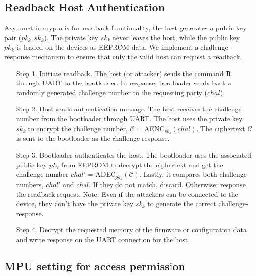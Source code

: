 \documentclass[11pt,oneside,onecolumn,letterpaper]{article}
\begin{document}
\subsection{Readback Host Authentication}
Asymmetric crypto is for readback functionality, the host generates a public key pair ($pk_k, sk_k$).
The private key $sk_k$ never leaves the host, while the public key $pk_k$ is loaded on the devices as EEPROM data.
We implement a challenge-response mechanism to ensure that only the valid host can request a readback.
\begin{itemize}
  \item[Step 1.] Initiate readback. 
  The host (or attacker) sends the command \textbf{R} through UART to the bootloader.
  In response, bootloader sends back a randomly generated challenge number to the requesting party ($chal$).  
  \item[Step 2.] Host sends authentication message.
  The host receives the challenge number from the bootloader through UART.
  The host uses the private key $sk_k$ to encrypt the challenge number, $\mathcal{C}$ = AENC$_{sk_k}(chal)$.
  The ciphertext $\mathcal{C}$ is sent to the bootloader as the challenge-response.
  \item[Step 3.] Bootloader authenticates the host.
  The bootloader uses the associated public key $pk_k$ from EEPROM to decrypt the ciphertext and get the challenge number $chal'$ = ADEC$_{pk_k}(\mathcal{C})$.
  Lastly, it compares both challenge numbers, $chal'$ and $chal$.
  If they do not match, discard.
  Otherwise: response the readback request.
  Note: Even if the attackers can be connected to the device, they don't have the private key $sk_k$ to generate the correct challenge-response.
  \item [Step 4.] Decrypt the requested memory of the firmware or configuration data and write response on the UART connection for the host.
\end{itemize}

\subsection{MPU setting for access permission}
\end{document}

